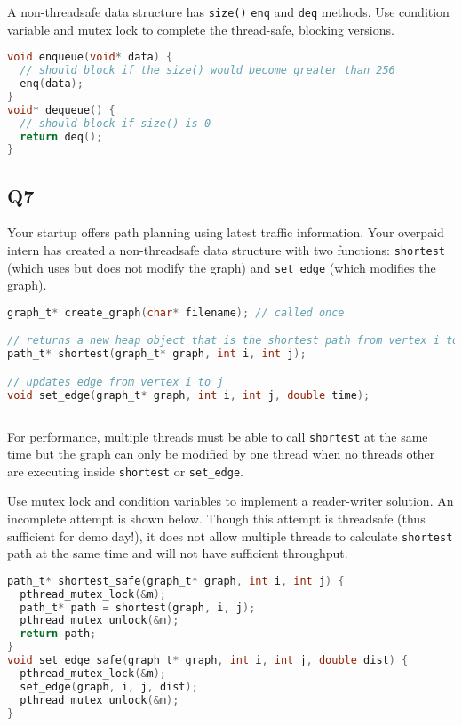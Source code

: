 A non-threadsafe data structure has \texttt{size()} \texttt{enq} and \texttt{deq} methods. Use condition variable and mutex lock to complete the thread-safe, blocking versions.

\begin{lstlisting}[language=C]
void enqueue(void* data) {
  // should block if the size() would become greater than 256
  enq(data);
}
void* dequeue() {
  // should block if size() is 0
  return deq();
}
\end{lstlisting}

\subsection{Q7}\label{q7}

Your startup offers path planning using latest traffic information. Your overpaid intern has created a non-threadsafe data structure with two functions: \texttt{shortest} (which uses but does not modify the graph) and \texttt{set\_edge} (which modifies the graph).

\begin{lstlisting}[language=C]
graph_t* create_graph(char* filename); // called once

// returns a new heap object that is the shortest path from vertex i to j
path_t* shortest(graph_t* graph, int i, int j); 

// updates edge from vertex i to j
void set_edge(graph_t* graph, int i, int j, double time); 
  
\end{lstlisting}

For performance, multiple threads must be able to call \texttt{shortest} at the same time but the graph can only be modified by one thread when no threads other are executing inside \texttt{shortest} or \texttt{set\_edge}.

Use mutex lock and condition variables to implement a reader-writer solution. An incomplete attempt is shown below. Though this attempt is threadsafe (thus sufficient for demo day!), it does not allow multiple threads to calculate \texttt{shortest} path at the same time and will not have sufficient throughput.

\begin{lstlisting}[language=C]
path_t* shortest_safe(graph_t* graph, int i, int j) {
  pthread_mutex_lock(&m);
  path_t* path = shortest(graph, i, j);
  pthread_mutex_unlock(&m);
  return path;
}
void set_edge_safe(graph_t* graph, int i, int j, double dist) {
  pthread_mutex_lock(&m);
  set_edge(graph, i, j, dist);
  pthread_mutex_unlock(&m);
}
\end{lstlisting}

